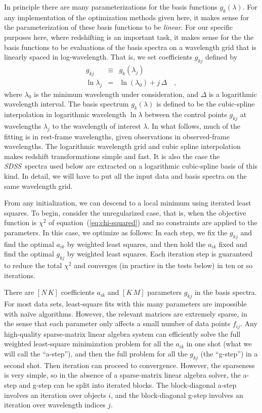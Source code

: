 \documentclass[12pt,preprint]{aastex}
\newcommand{\project}[1]{\textsl{#1}}
\newcommand{\sdss}{\project{SDSS}}
\newcommand{\equationname}{equation}
\begin{document}
In principle there are many parameterizations for the basis functions
$g_k(\lambda)$.  For any implementation of the optimization methods
given here, it makes sense for the parameterization of these basis
functions to be \emph{linear}.  For our specific purposes here, where
redshifting is an important task, it makes sense for the the basis
functions to be evaluations of the basis spectra on a wavelength grid
that is linearly spaced in log-wavelength.  That is, we set
coefficients $g_{kj}$ defined by
\begin{eqnarray}\displaystyle
g_{kj} & \equiv & g_k(\lambda_j) \nonumber\\
\ln\lambda_j & = & \ln(\lambda_0) + j\,\Delta
\quad ,
\end{eqnarray}
where $\lambda_0$ is the minimum wavelength under consideration, and
$\Delta$ is a logarithmic wavelength interval.  The basis spectrum
$g_k(\lambda)$ is defined to be the cubic-spline interpolation in
logarithmic wavelength $\ln\lambda$ between the control points
$g_{kj}$ at wavelengths $\lambda_j$ to the wavelength of interest
$\lambda$.  In what follows, much of the fitting is in rest-frame
wavelengths, given observations in observed-frame wavelengths.  The
logarithmic wavelength grid and cubic spline interpolation makes
redshift transformations simple and fast.  It is also the case the
\sdss\ spectra used below are extracted on a logarithmic cubic-spline
basis of this kind.  In detail, we will have to put all the input data
and basis spectra on the same wavelength grid.

From any initialization, we can descend to a local minimum using
iterated least squares.  To begin, consider the unregularized case,
that is, when the objective function is $\chi^2$ of
\equationname~(\ref{eq:chi-squared}) and no constraints are applied to
the parameters.  In this case, we optimize as follows: In each step,
we fix the $g_{kj}$ and find the optimal $a_{ik}$ by weighted least
squares, and then hold the $a_{ik}$ fixed and find the optimal
$g_{kj}$ by weighted least squares. Each iteration step is guaranteed
to reduce the total $\chi^2$ and converges (in practice in the tests
below) in ten or so iterations.

There are $[N\,K]$ coefficients $a_{ik}$ and $[K\,M]$ parameters
$g_{kj}$ in the basis spectra.  For most data sets, least-square fits
with this many parameters are impossible with na\"ive algorithms.
However, the relevant matrices are extremely sparse, in the sense that
each parameter only affects a small number of data points $f_{ij}$.
Any high-quality sparse-matrix linear algebra system can efficiently
solve the full weighted least-square minimization problem for all the
$a_{ik}$ in one shot (what we will call the ``a-step''), and then the
full problem for all the $g_{kj}$ (the ``g-step'') in a second shot.
Then iteration can proceed to convergence.  However, the sparseness is
very simple, so in the absence of a sparse-matrix linear algebra
solver, the a-step and g-step can be split into iterated blocks.  The
block-diagonal a-step involves an iteration over objects $i$, and the
block-diagonal g-step involves an iteration over wavelength indices
$j$.
\end{document}

